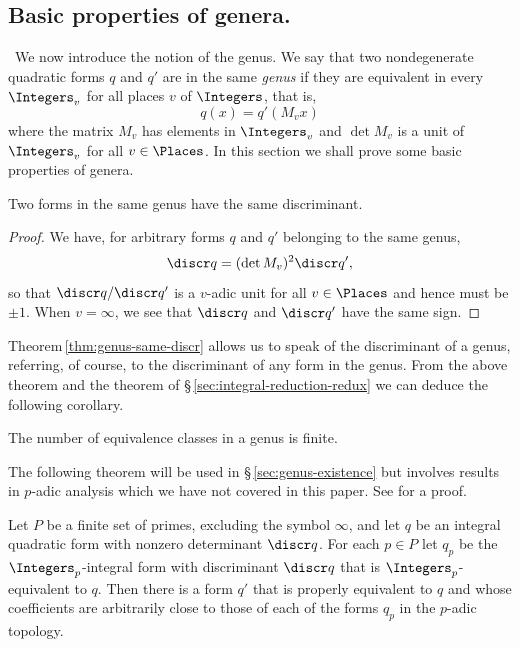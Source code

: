 \subsection{Basic properties of genera.}~We now introduce the notion of the genus. We say that two nondegenerate quadratic forms \(q\) and \(q'\) are in the same \emph{genus} if they are equivalent in every \(\Integers_v\) for all places \(v\) of \(\Integers\), that is,
\[
    q(x) = q'(M_v x)
\]
where the matrix \(M_v\) has elements in \(\Integers_v\) and \(\det M_v\) is a unit of \(\Integers_v\) for all \(v \in \Places\). In this section we shall prove some basic properties of genera.\label{sec:basic-properties-of-genera}

\begin{theoremx}\label{thm:genus-same-discr}
    {\normalfont \cite[p.\,140]{cassels2008rational}}
    Two forms in the same genus have the same discriminant.
\end{theoremx}

\begin{proof}
    We have, for arbitrary forms \(q\) and \(q'\) belonging to the same genus,
    \[
        \discr q = (\det M_v)^2 \discr q',
    \]
    so that \(\discr q/\discr q'\) is a \(v\)-adic unit for all \(v \in \Places\) and hence must be \(\pm 1\). When \(v = \infty\), we see that \(\discr q\) and \(\discr q'\) have the same sign.
\end{proof}

Theorem\,\ref{thm:genus-same-discr} allows us to speak of the discriminant of a genus, referring, of course, to the discriminant of any form in the genus. From the above theorem and the theorem of \S\,\ref{sec:integral-reduction-redux} we can deduce the following corollary.

\begin{corollary}
    The number of equivalence classes in a genus is finite.
\end{corollary}

The following theorem will be used in \S\,\ref{sec:genus-existence} but involves results in \(p\)-adic analysis which we have not covered in this paper. See \cite[p.\,140]{cassels2008rational} for a proof.

\begin{theoremx}
    \label{thm:genus-topology}
    Let \(P\) be a finite set of primes, excluding the symbol \(\infty\), and let \(q\) be an integral quadratic form with nonzero determinant \(\discr q\). For each \(p \in P\) let \(q_p\) be the \(\Integers_p\)-integral form with discriminant \(\discr q\) that is \(\Integers_p\)-equivalent to \(q\). Then there is a form \(q'\) that is properly equivalent to \(q\) and whose coefficients are arbitrarily close to those of each of the forms \(q_p\) in the \(p\)-adic topology.
\end{theoremx}

